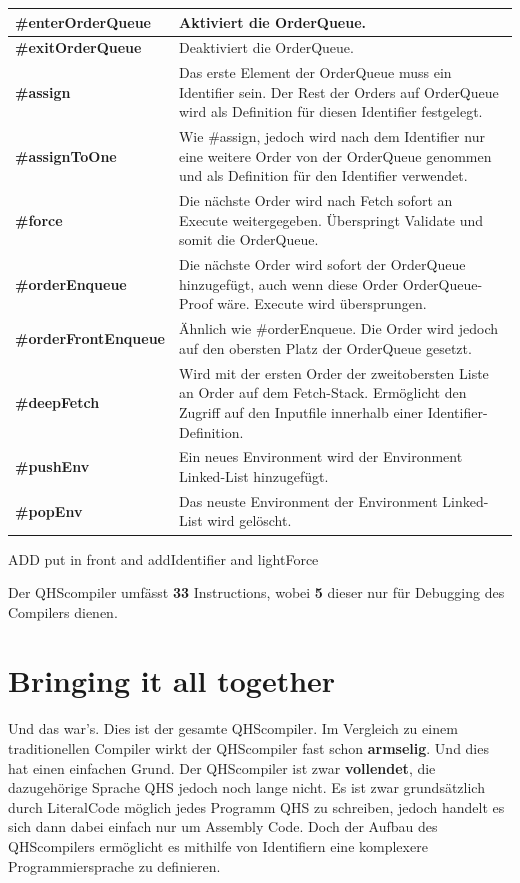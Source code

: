 \begin{table}[H]
    \centering
    \begin{tabularx}{\textwidth}{l|X}
    \textbf{\#enterOrderQueue}      & Aktiviert die OrderQueue. \\ \hline
    \textbf{\#exitOrderQueue}       & Deaktiviert die OrderQueue. \\ \hline
    \textbf{\#assign}               & Das erste Element der OrderQueue muss ein Identifier sein. Der Rest der Orders auf OrderQueue wird als Definition für diesen Identifier festgelegt. \\ \hline
    \textbf{\#assignToOne}          & Wie \#assign, jedoch wird nach dem Identifier nur eine weitere Order von der OrderQueue genommen und als Definition für den Identifier verwendet. \\ \hline
    \textbf{\#force}                & Die nächste Order wird nach Fetch sofort an Execute weitergegeben. Überspringt Validate und somit die OrderQueue. \\ \hline
    \textbf{\#orderEnqueue}         & Die nächste Order wird sofort der OrderQueue hinzugefügt, auch wenn diese Order OrderQueue-Proof wäre. Execute wird übersprungen. \\ \hline
    \textbf{\#orderFrontEnqueue}    & Ähnlich wie \#orderEnqueue. Die Order wird jedoch auf den obersten Platz der OrderQueue gesetzt. \\ \hline
    \textbf{\#deepFetch}            & Wird mit der ersten Order der zweitobersten Liste an Order auf dem Fetch-Stack. Ermöglicht den Zugriff auf den Inputfile innerhalb einer Identifier-Definition. \\ \hline
    \textbf{\#pushEnv}              & Ein neues Environment wird der Environment Linked-List hinzugefügt. \\ \hline
    \textbf{\#popEnv}               & Das neuste Environment der Environment Linked-List wird gelöscht.
        
    \end{tabularx}
\end{table}

ADD put in front and addIdentifier and lightForce

Der QHScompiler umfässt \textbf{33} Instructions, wobei \textbf{5} dieser nur für Debugging des Compilers dienen.

\section{Bringing it all together} \label{sec:qhs-bringing-it-together}
Und das war's. Dies ist der gesamte QHScompiler. Im Vergleich zu einem traditionellen Compiler wirkt der QHScompiler fast schon \textbf{armselig}. Und dies hat einen einfachen Grund. Der QHScompiler ist zwar \textbf{vollendet},
die dazugehörige Sprache QHS jedoch noch lange nicht. Es ist zwar grundsätzlich durch LiteralCode möglich jedes Programm QHS zu schreiben, jedoch handelt es sich dann dabei einfach nur um Assembly Code.
Doch der Aufbau des QHScompilers ermöglicht es mithilfe von Identifiern eine komplexere Programmiersprache zu definieren.

